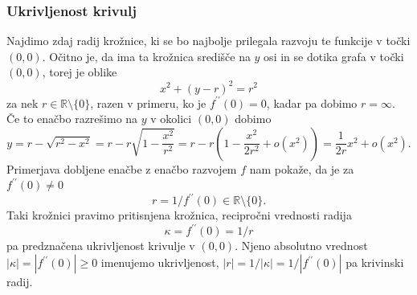 \documentclass[8pt]{beamer}
\theoremstyle{definition}
\theoremstyle{remark}
\theoremstyle{plain}
\numberwithin{equation}{section}  %
\begin{document}
\begin{frame}
    \frametitle{Ukrivljenost krivulj}

    Najdimo zdaj radij krožnice, ki se bo najbolje prilegala razvoju te funkcije v točki $(0,0)$. Očitno je, da ima ta krožnica središče na $y$ osi in se dotika grafa v točki $(0,0)$, torej je oblike
    \begin{equation*}
        x^2+(y-r)^2=r^2
    \end{equation*}
    za nek $r \in \mathbb{R} \setminus \{0\}$, razen v primeru, ko je $f^{\prime \prime}(0)=0$, kadar pa dobimo $r=\infty$. Če to enačbo razrešimo na $y$ v okolici $(0,0)$ dobimo 
    \begin{equation*}
        y=r-\sqrt{r^2-x^2}=r-r \sqrt{1-\frac{x^2}{r^2}}=r-r\left(1-\frac{x^2}{2 r^2}+o\left(x^2\right)\right)=\frac{1}{2 r} x^2+o\left(x^2\right).
    \end{equation*}
    Primerjava dobljene enačbe z enačbo razvojem $f$ nam pokaže, da je za $f^{\prime \prime}(0)\neq0$ 
    \begin{equation*}
        r=1 / f^{\prime \prime}(0) \in \mathbb{R} \setminus \{0\}.
    \end{equation*}
    Taki krožnici pravimo \textcolor{red1}{pritisnjena krožnica}, recipročni vrednosti radija 
    \begin{equation*}
        \kappa=f^{\prime \prime}(0)=1 / r
    \end{equation*}
    pa \textcolor{red1}{predznačena ukrivljenost} krivulje v $(0,0)$. Njeno absolutno vrednost $|\kappa|=\left|f^{\prime \prime}(0)\right| \geq 0$ imenujemo \textcolor{red1}{ukrivljenost}, $|r|=1 /|\kappa|=1 /\left|f^{\prime \prime}(0)\right|$ pa \textcolor{red1}{krivinski radij}. 

\end{frame}
\end{document}
